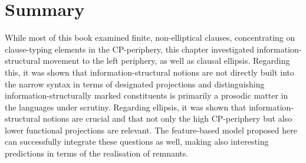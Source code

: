 \section{Summary} \label{sec:6summary}
While most of this book examined finite, non-elliptical clauses, concentrating on clause-typing elements in the CP-periphery, this chapter investigated in\-for\-ma\-tion-struc\-tur\-al movement to the left periphery, as well as clausal ellipsis. Regarding this, it was shown that information-structural notions are not directly built into the narrow syntax in terms of designated projections and distinguishing information-structurally marked constituents is primarily a prosodic matter in the languages under scrutiny. Regarding ellipsis, it was shown that information-structural notions are crucial and that not only the high CP-periphery but also lower functional projections are relevant. The feature-based model proposed here can successfully integrate these questions as well, making also interesting predictions in terms of the realisation of remnants. 
